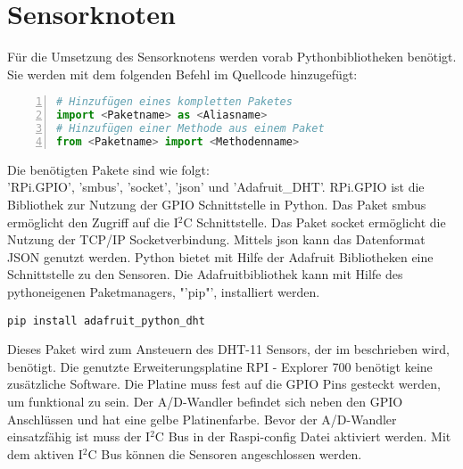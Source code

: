 \section{Sensorknoten} %
Für die Umsetzung des Sensorknotens werden vorab Pythonbibliotheken benötigt. Sie werden mit dem folgenden Befehl im Quellcode hinzugefügt:
\begin{lstlisting}[caption=Importbefehl in Python,frame=single,numbers=left,language=Python]
# Hinzufügen eines kompletten Paketes
import <Paketname> as <Aliasname>
# Hinzufügen einer Methode aus einem Paket
from <Paketname> import <Methodenname>
\end{lstlisting}
Die benötigten Pakete sind wie folgt: \\
'RPi.GPIO', 'smbus', 'socket', 'json' und 'Adafruit\_DHT'. RPi.GPIO ist die Bibliothek zur Nutzung der \ac{GPIO} Schnittstelle in Python. Das Paket smbus ermöglicht den Zugriff auf die I$^2$C Schnittstelle. Das Paket socket ermöglicht die Nutzung der TCP/IP Socketverbindung. Mittels json kann das Datenformat \ac{JSON} genutzt werden. Python bietet mit Hilfe der Adafruit\cite{Adafruit60:online} Bibliotheken eine Schnittstelle zu den Sensoren. Die Adafruitbibliothek kann mit Hilfe des pythoneigenen Paketmanagers, "'pip"', installiert werden.
\begin{lstlisting}[caption=Installation der Adafruit Bibliothek mit pip,frame=single]
pip install adafruit_python_dht
\end{lstlisting}
Dieses Paket wird zum Ansteuern des DHT-11 Sensors, der im  beschrieben wird, benötigt. Die genutzte Erweiterungsplatine RPI - Explorer 700 benötigt keine zusätzliche Software. Die Platine muss fest auf die \ac{GPIO} Pins gesteckt werden, um funktional zu sein. Der \ac{A/D-Wandler} befindet sich neben den \ac{GPIO} Anschlüssen und hat eine gelbe Platinenfarbe. Bevor der \ac{A/D-Wandler} einsatzfähig ist muss der I$^2$C Bus in der Raspi-config Datei aktiviert werden. Mit dem aktiven I$^2$C Bus können die Sensoren angeschlossen werden.
